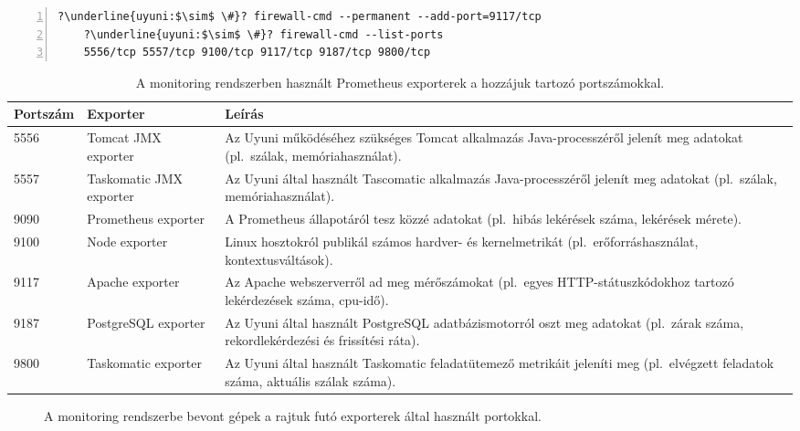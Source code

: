 \vspace{2mm}
\begin{lstlisting}[caption=Tűzfalszabályok módosítása.,label=lst:firewalld-add-port, numbers=left,escapechar=?]
	?\underline{uyuni:$\sim$ \#}? firewall-cmd --permanent --add-port=9117/tcp
	?\underline{uyuni:$\sim$ \#}? firewall-cmd --list-ports
	5556/tcp 5557/tcp 9100/tcp 9117/tcp 9187/tcp 9800/tcp
\end{lstlisting}

\begin{table}[h]
	\setlength{\tabcolsep}{5pt}
	\renewcommand{\arraystretch}{1.3}
	\centering
	\begin{tabular}{||l l m{7.6cm}||}
		\hline
		Portszám & Exporter & Leírás \\
		\hline\hline
		5556 & Tomcat JMX exporter & Az Uyuni működéséhez szükséges Tomcat alkalmazás Java-processzéről jelenít meg adatokat (pl.~szálak, memóriahasználat). \\
		\hline
		5557 & Taskomatic JMX exporter & Az Uyuni által használt Tascomatic alkalmazás Java-processzéről jelenít meg adatokat (pl.~szálak, memóriahasználat). \\
		\hline
		9090 & Prometheus exporter & A Prometheus állapotáról tesz közzé adatokat (pl.~hibás lekérések száma, lekérések mérete).  \\
		\hline
		9100 & Node exporter & Linux hosztokról publikál számos hardver- és kernelmetrikát (pl.~erőforráshasználat, kontextusváltások). \\
		\hline
		9117 & Apache exporter & Az Apache webszerverről ad meg mérőszámokat (pl.~egyes HTTP-státuszkódokhoz tartozó lekérdezések száma, \acrshort{cpu}-idő).  \\
		\hline
		9187 & PostgreSQL exporter & Az Uyuni által használt PostgreSQL adatbázismotorról oszt meg adatokat (pl.~zárak száma, rekordlekérdezési és frissítési ráta).  \\
		\hline
		9800 & Taskomatic exporter & Az Uyuni által használt Taskomatic feladatütemező metrikáit jeleníti meg (pl.~elvégzett feladatok száma, aktuális szálak száma).  \\
		\hline
	\end{tabular}
	\caption{A monitoring rendszerben használt Prometheus exporterek a hozzájuk tartozó portszámokkal.}
	\label{tab:monitoring-exporters}
\end{table}

\begin{figure}[ht]
	\centering
	
	\caption{A monitoring rendszerbe bevont gépek a rajtuk futó exporterek által használt portokkal.}
	\label{fig:monitoring-setup}
\end{figure}
